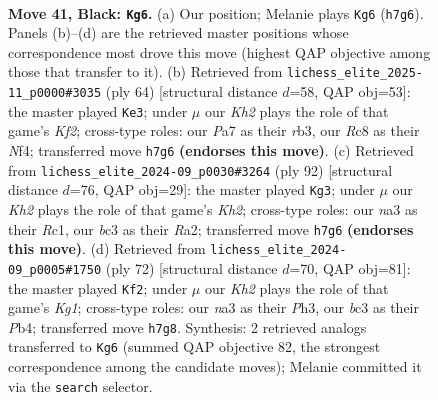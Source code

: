 \documentclass[11pt]{article}
\begin{document}
\clearpage

\begin{figure}[p]\centering
\begin{subfigure}{0.46\textwidth}\centering
\resizebox{\linewidth}{!}{%
\newchessgame
\chessboard[
  setfen={1rr5/pn3p1k/1p2p2p/7R/2P5/N1B1P3/PR3PP1/5K2 b - - 0 41},
  showmover=false,
  pgfstyle=straightmove, color=movearrow, markmove={h7-g6}
]}
\caption{}
\end{subfigure}\hfill
\begin{subfigure}{0.46\textwidth}\centering
\resizebox{\linewidth}{!}{%
\newchessgame
\chessboard[
  setfen={6k1/p2n1ppb/B7/2r4p/4PN1P/1rp2PP1/2R2K2/2R5 w - - 9 33},
  showmover=false,
  pgfstyle=straightmove, color=movearrow, markmove={f2-e3}
]}
\caption{}
\end{subfigure}
\\[4pt]
\begin{subfigure}{0.46\textwidth}\centering
\resizebox{\linewidth}{!}{%
\newchessgame
\chessboard[
  setfen={6r1/r4pk1/P1B1p2p/2b1P2p/2P2P2/3pn3/R2B3K/2R5 w - - 8 47},
  showmover=false,
  pgfstyle=straightmove, color=movearrow, markmove={h2-g3}
]}
\caption{}
\end{subfigure}\hfill
\begin{subfigure}{0.46\textwidth}\centering
\resizebox{\linewidth}{!}{%
\newchessgame
\chessboard[
  setfen={4r3/4Pr1p/p3Rpk1/8/1Pp3P1/2P4P/P7/4R1K1 w - - 2 37},
  showmover=false,
  pgfstyle=straightmove, color=movearrow, markmove={g1-f2}
]}
\caption{}
\end{subfigure}
\caption{\textbf{Move 41, Black: \texttt{Kg6}.} (a) Our position; Melanie plays \texttt{Kg6} (\texttt{h7g6}). Panels (b)--(d) are the retrieved master positions whose correspondence most drove this move (highest QAP objective among those that transfer to it). (b) Retrieved from \texttt{lichess\_elite\_2025-11\_p0000\#3035} (ply 64) [structural distance $d$=58, QAP obj=53]: the master played \texttt{Ke3}; under $\mu$ our \emph{Kh2} plays the role of that game's \emph{Kf2}; cross-type roles: our \emph{P}a7 as their \emph{r}b3, our \emph{R}c8 as their \emph{N}f4; transferred move \texttt{h7g6} \textbf{(endorses this move)}. (c) Retrieved from \texttt{lichess\_elite\_2024-09\_p0030\#3264} (ply 92) [structural distance $d$=76, QAP obj=29]: the master played \texttt{Kg3}; under $\mu$ our \emph{Kh2} plays the role of that game's \emph{Kh2}; cross-type roles: our \emph{n}a3 as their \emph{R}c1, our \emph{b}c3 as their \emph{R}a2; transferred move \texttt{h7g6} \textbf{(endorses this move)}. (d) Retrieved from \texttt{lichess\_elite\_2024-09\_p0005\#1750} (ply 72) [structural distance $d$=70, QAP obj=81]: the master played \texttt{Kf2}; under $\mu$ our \emph{Kh2} plays the role of that game's \emph{Kg1}; cross-type roles: our \emph{n}a3 as their \emph{P}h3, our \emph{b}c3 as their \emph{P}b4; transferred move \texttt{h7g8}. Synthesis: 2 retrieved analogs transferred to \texttt{Kg6} (summed QAP objective 82, the strongest correspondence among the candidate moves); Melanie committed it via the \texttt{search} selector.}
\label{fig:thought-m81}
\end{figure}
\end{document}
